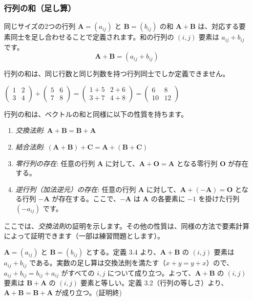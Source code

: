 \subsubsection{行列の和（足し算）}
\begin{dfn}[行列の和]
同じサイズの2つの行列 $\bm{A} = (a_{ij})$ と $\bm{B} = (b_{ij})$ の和 $\bm{A} + \bm{B}$ は、対応する要素同士を足し合わせることで定義されます。和の行列の $(i,j)$ 要素は $a_{ij} + b_{ij}$ です。
\[\bm{A} + \bm{B} = (a_{ij} + b_{ij})\]
\end{dfn}
\begin{rmk*}
行列の和は、同じ行数と同じ列数を持つ行列同士でしか定義できません。
\end{rmk*}
\begin{ex}
$\begin{pmatrix} 1 & 2 \\ 3 & 4 \end{pmatrix} + \begin{pmatrix} 5 & 6 \\ 7 & 8 \end{pmatrix} = \begin{pmatrix} 1+5 & 2+6 \\ 3+7 & 4+8 \end{pmatrix} = \begin{pmatrix} 6 & 8 \\ 10 & 12 \end{pmatrix}$
\end{ex}
\begin{thm}[行列の和の性質]
行列の和は、ベクトルの和と同様に以下の性質を持ちます。
\begin{enumerate}
\item \emph{交換法則}: $\bm{A} + \bm{B} = \bm{B} + \bm{A}$
\item \emph{結合法則}: $(\bm{A} + \bm{B}) + \bm{C} = \bm{A} + (\bm{B} + \bm{C})$
\item \emph{零行列の存在}: 任意の行列 $\bm{A}$ に対して、$\bm{A} + \bm{O} = \bm{A}$ となる零行列 $\bm{O}$ が存在する。
\item \emph{逆行列（加法逆元）の存在}: 任意の行列 $\bm{A}$ に対して、$\bm{A} + (-\bm{A}) = \bm{O}$ となる行列 $-\bm{A}$ が存在する。ここで、$-\bm{A}$ は $\bm{A}$ の各要素に $-1$ を掛けた行列 $(-a_{ij})$ です。
\end{enumerate}
\begin{proof*}
ここでは、\emph{交換法則}の証明を示します。その他の性質は、同様の方法で要素計算によって証明できます（一部は練習問題とします）。\par
$\bm{A} = (a_{ij})$ と $\bm{B} = (b_{ij})$ とする。定義 3.4 より、$\bm{A} + \bm{B}$ の $(i,j)$ 要素は $a_{ij} + b_{ij}$ である。実数の足し算は交換法則を満たす（$x+y = y+x$）ので、$a_{ij} + b_{ij} = b_{ij} + a_{ij}$ がすべての $i,j$ について成り立つ。よって、$\bm{A} + \bm{B}$ の $(i,j)$ 要素は $\bm{B} + \bm{A}$ の $(i,j)$ 要素と等しい。定義 3.2（行列の等しさ）より、$\bm{A} + \bm{B} = \bm{B} + \bm{A}$ が成り立つ。(証明終)
\end{proof*}
\end{thm}

